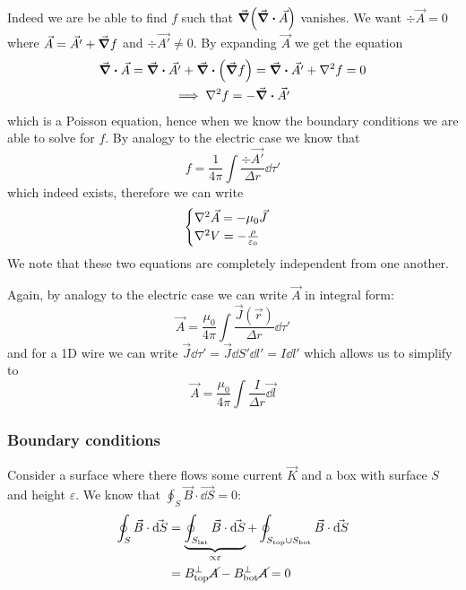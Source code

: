 \documentclass[12pt]{extarticle}
\begin{document}
Indeed we are be able to find $f$ such that $\grad(\div \vec A)$ vanishes.
We want $\div \vec A = 0$ where $\vec A = \vec{A'} + \grad f$ and $\div \vec{A'} \neq 0$.
By expanding $\vec A$ we get the equation
\begin{gather}
	\div \vec A = \div \vec{A '} + \div(\grad f) = \div \vec{A '} + \laplacian f = 0 \\
	\implies \laplacian f = - \div \vec{A '}
\end{gather}
which is a Poisson equation, hence when we know the boundary conditions we are able to solve for $f$.
By analogy to the electric case we know that
\begin{equation}
	f = \frac{1}{4 \pi} \int \frac{\div \vec{A '}}{\Delta r} \dd \tau '
\end{equation}
which indeed exists, therefore we can write
\begin{equation}
	\begin{cases}
		\laplacian \vec A = - \mu_0 \vec J \\
		\laplacian V = - \frac{\rho}{\varepsilon_0}
	\end{cases}
\end{equation}
We note that these two equations are completely independent from one another.

Again, by analogy to the electric case we can write $\vec A$ in integral form:
\begin{equation}
	\vec A = \frac{\mu_0}{4 \pi} \int \frac{\vec J(\vec r)}{\Delta r} \dd \tau '
\end{equation}
and for a 1D wire we can write $\vec J \dd \tau' = \vec J \dd S' \dd l ' = I \dd l'$
which allows us to simplify to
\begin{equation}
	\vec A = \frac{\mu_0}{4 \pi}\int \frac{I}{\Delta r} \vec{\dd l}
\end{equation}

\subsubsection{Boundary conditions}

Consider a surface where there flows some current $\vec K$ and a box with surface $S$ and height $\varepsilon$.
We know that $\oint_S \vec B \cdot \vec{\dd S} = 0$:
\begin{align}
	\oint_S \vec B \cdot \vec{\dd S}
	 & = \underbrace{\oint_{S_\text{lat}} \vec B \cdot \vec{\dd S}}_{\propto \varepsilon} +\oint_{S_\text{top} \cup S_\text{bot}}\vec B \cdot \vec{\dd S} \\
	 & = B_\text{top}^{\perp} \cancel{A} - B_\text{bot}^{\perp} \cancel{A} = 0
\end{align}
\end{document}
